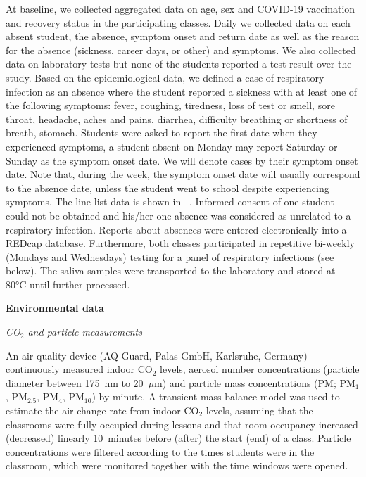 \documentclass[fleqn,11pt]{wlscirep}
\begin{document}
\noindent At baseline, we collected aggregated data on age, sex and COVID-19 vaccination and recovery status in the participating classes. Daily we collected data on each absent student, \ie the absence, symptom onset and return date as well as the reason for the absence (sickness, career days,  or other) and symptoms. We also collected data on laboratory tests but none of the students reported a test result over the study. Based on the epidemiological data, we defined a case of respiratory infection as an absence where the student reported a sickness with at least one of the following symptoms: fever, coughing, tiredness, loss of test or smell, sore throat, headache, aches and pains, diarrhea, difficulty breathing or shortness of breath, stomach. Students were asked to report the first date when they experienced symptoms, \eg a student absent on Monday may report Saturday or Sunday as the symptom onset date. We will denote cases by their symptom onset date. Note that, during the week, the symptom onset date will usually correspond to the absence date, unless the student went to school despite experiencing symptoms. The line list data is shown in \supp~. Informed consent of one student could not be obtained and his/her one absence was considered as unrelated to a respiratory infection. Reports about absences were entered electronically into a REDcap database\cite{Harris2009,Harris2019}. Furthermore, both classes participated in repetitive bi-weekly (Mondays and Wednesdays) testing for a panel of respiratory infections (see  below). The saliva samples were transported to the laboratory and stored at $-$80°C until further processed\cite{Galar2021,To2019,Huber2021}. \medskip

\noindent\textbf{Environmental data} \smallskip

\noindent \emph{CO$_2$ and particle measurements} 

\noindent An air quality device (AQ Guard, Palas GmbH, Karlsruhe, Germany) continuously measured indoor CO$_2$ levels, aerosol number concentrations (particle diameter between 175~nm to 20~$\mu$m) and particle mass concentrations (PM; PM$_1$, PM$_{2.5}$, PM$_4$, PM$_{10}$) by minute. A transient mass balance model was used to estimate the air change rate from indoor CO$_2$ levels\cite{Batterman2017IJERPH}, assuming that the classrooms were fully occupied during lessons and that room occupancy increased (decreased) linearly 10~minutes before (after) the start (end) of a class. Particle concentrations were filtered according to the times students were in the classroom, which were monitored together with the time windows were opened. \medskip
\end{document}
